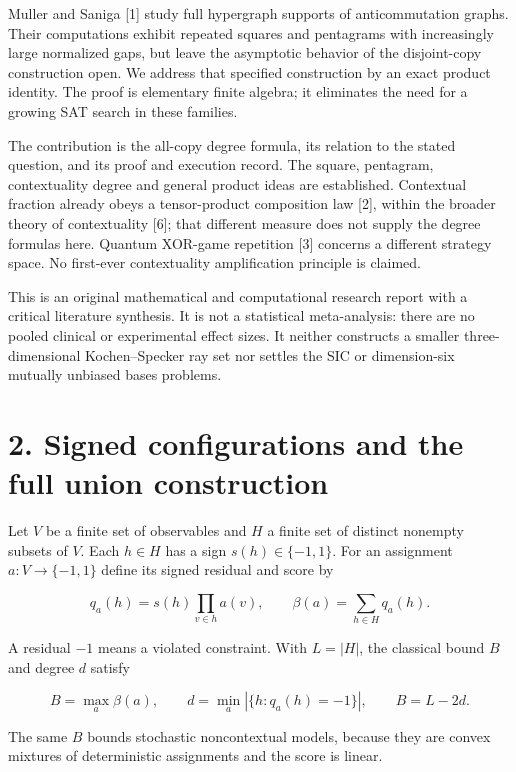 \documentclass[10pt,a4paper]{article}
\begin{document}
Muller and Saniga {[}1{]} study full hypergraph supports of anticommutation graphs. Their computations exhibit repeated squares and pentagrams with increasingly large normalized gaps, but leave the asymptotic behavior of the disjoint-copy construction open. We address that specified construction by an exact product identity. The proof is elementary finite algebra; it eliminates the need for a growing SAT search in these families.

The contribution is the all-copy degree formula, its relation to the stated question, and its proof and execution record. The square, pentagram, contextuality degree and general product ideas are established. Contextual fraction already obeys a tensor-product composition law {[}2{]}, within the broader theory of contextuality {[}6{]}; that different measure does not supply the degree formulas here. Quantum XOR-game repetition {[}3{]} concerns a different strategy space. No first-ever contextuality amplification principle is claimed.

This is an original mathematical and computational research report with a critical literature synthesis. It is not a statistical meta-analysis: there are no pooled clinical or experimental effect sizes. It neither constructs a smaller three-dimensional Kochen--Specker ray set nor settles the SIC or dimension-six mutually unbiased bases problems.

\section{2. Signed configurations and the full union construction}\label{signed-configurations-and-the-full-union-construction}

Let \(V\) be a finite set of observables and \(H\) a finite set of distinct nonempty subsets of \(V\). Each \(h\in H\) has a sign \(s(h)\in\{-1,1\}\). For an assignment \(a:V\to\{-1,1\}\) define its signed residual and score by

\[q_a(h)=s(h)\prod_{v\in h}a(v),\qquad
\beta(a)=\sum_{h\in H}q_a(h).\]

A residual \(-1\) means a violated constraint. With \(L=|H|\), the classical bound \(B\) and degree \(d\) satisfy

\[B=\max_a\beta(a),\qquad d=\min_a|\{h:q_a(h)=-1\}|,
\qquad B=L-2d. \tag{1}\]

The same \(B\) bounds stochastic noncontextual models, because they are convex mixtures of deterministic assignments and the score is linear.
\end{document}
